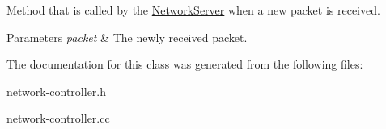 Method that is called by the \hyperlink{classns3_1_1lorawan_1_1NetworkServer}{Network\+Server} when a new packet is received.


\begin{DoxyParams}{Parameters}
{\em packet} & The newly received packet. \\
\hline
\end{DoxyParams}


The documentation for this class was generated from the following files\+:\begin{DoxyCompactItemize}
\item 
network-\/controller.\+h\item 
network-\/controller.\+cc\end{DoxyCompactItemize}

